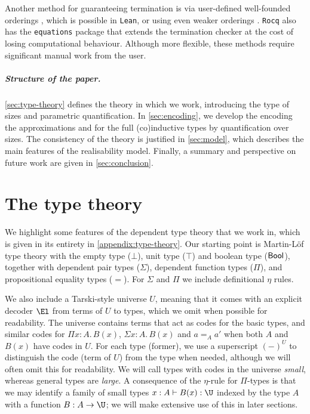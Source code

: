 Another method for guaranteeing termination is via user-defined well-founded orderings \cite{Leroy2024}, which is possible in \texttt{Lean}, or using even weaker orderings \cite{qwf-order}.
\texttt{Rocq} also has the \texttt{equations} package \cite{hutchison_equations_2010,mangin2015equations,sozeau2019equations} that extends the termination checker at the cost of losing computational behaviour.
Although more flexible, these methods require significant manual work from the user.

\subparagraph*{Structure of the paper.}
\autoref{sec:type-theory} defines the theory in which we work, introducing the type of sizes and parametric quantification. In \autoref{sec:encoding}, we develop the encoding the approximations and for the full (co)inductive types by quantification over sizes. The consistency of the theory is justified in \autoref{sec:model}, which describes the main features of the realisability model. Finally, a summary and perspective on future work are given in \autoref{sec:conclusion}.
    
    \section{The type theory} 
    \label{sec:type-theory}
    
\newenvironment{bprooftree}
{\leavevmode\hbox\bgroup}
{\DisplayProof\egroup}

We highlight some features of the dependent type theory that we work in, which is given in its entirety in \autoref{appendix:type-theory}. 
Our starting point is Martin-L\"of type theory with the empty type (\(\bot\)), unit type (\(\top\)) and boolean type (\(\sf{Bool}\)), together with dependent pair types (\(\Sigma\)), dependent function types (\(\Pi\)), and propositional equality types (\(=\)).
For \(\Sigma\) and \(\Pi\) we include definitional \(\eta\) rules.

We also include a Tarski-style universe \(U\), meaning that it comes with an explicit decoder \( \El \) from terms of \(U\) to types, which we omit when possible for readability.
The universe contains terms that act as codes for the basic types, and similar codes for \(\Pi x:A.\,B(x)\), \(\Sigma x:A.\,B(x)\) and \(a=_Aa'\) when both \(A\) and \(B(x)\) have codes in \(U\).
For each type (former), we use a superscript \((-)^U\) to distinguish the code (term of \(U\)) from the type when needed, although we will often omit this for readability.
We will call types with codes in the universe \emph{small}, whereas general types are \emph{large}.
A consequence of the $\eta$-rule for $\Pi$-types is that we may identify a family of small types $x:A\vdash B(x):\U$ indexed by the type $A$ with a function $B:A\to\U$; we will make extensive use of this in later sections.

